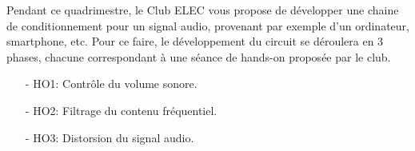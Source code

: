 Pendant ce quadrimestre, le Club ELEC vous propose de développer une chaine de conditionnement pour un signal audio, provenant par exemple d'un ordinateur, smartphone, etc. Pour ce faire, le développement du circuit se déroulera en 3 phases, chacune correspondant à une séance de hands-on proposée par le club.

\begin{itemize}
	\item[-] HO1: Contrôle du volume sonore.
	\item[-] HO2: Filtrage du contenu fréquentiel.
	\item[-] HO3: Distorsion du signal audio.
\end{itemize}